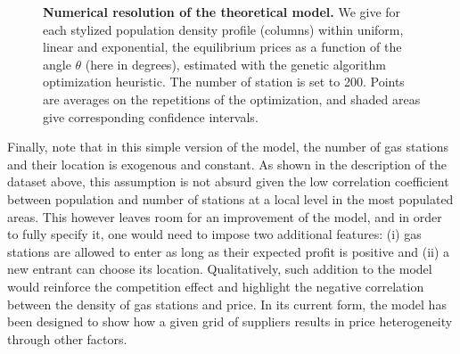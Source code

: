 \documentclass[10pt]{article}
\begin{document}
\begin{figure}
\centering
\label{fig:thmodel}
	\caption{\textbf{Numerical resolution of the theoretical model.} We give for each stylized population density profile (columns) within uniform, linear and exponential, the equilibrium prices as a function of the angle $\theta$ (here in degrees), estimated with the genetic algorithm optimization heuristic. The number of station is set to 200. Points are averages on the repetitions of the optimization, and shaded areas give corresponding confidence intervals.}
\end{figure}


Finally, note that in this simple version of the model, the number of gas stations and their location is exogenous and constant. As shown in the description of the dataset above, this assumption is not absurd given the low correlation coefficient between population and number of stations at a local level in the most populated areas. This however leaves room for an improvement of the model, and in order to fully specify it, one would need to impose two additional features: (i) gas stations are allowed to enter as long as their expected profit is positive and (ii) a new entrant can choose its location. Qualitatively, such addition to the model would reinforce the competition effect and highlight the negative correlation between the density of gas stations and price. In its current form, the model has been designed to show how a given grid of suppliers results in price heterogeneity through other factors.
\end{document}
